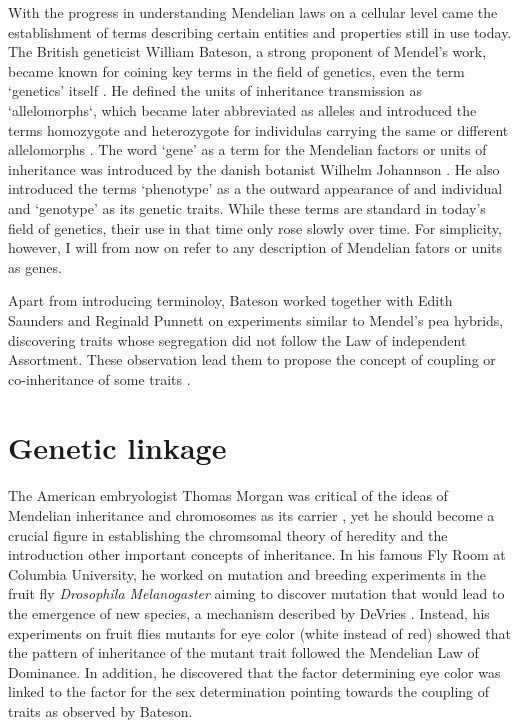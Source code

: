 With the progress in understanding Mendelian laws on a cellular level came the establishment of terms describing certain entities and properties still in use today. The British geneticist William Bateson, a strong proponent of Mendel's work, became known for coining key terms in the field of genetics, even the term `genetics' itself \citep{Dunwell2007}. He defined the units of inheritance transmission as `allelomorphs`, which became later abbreviated as alleles and introduced the terms homozygote and heterozygote for individulas carrying the same or different allelomorphs \citep{Bateson1902}. The word `gene' as a term for the Mendelian factors or units of inheritance was introduced by the danish botanist Wilhelm Johannson \citep{Johannsen1911}. He also introduced the terms `phenotype' as a the outward appearance of and individual and `genotype' as its genetic traits. While these terms are standard in today's field of genetics, their use in that time only rose slowly over time. For simplicity, however, I will from now on refer to any description of Mendelian fators or units as genes. 

Apart from introducing terminoloy, Bateson worked together with Edith Saunders and Reginald Punnett on experiments similar to Mendel's pea hybrids, discovering traits whose segregation did not follow the Law of independent Assortment. These observation lead them to propose the concept of coupling or co-inheritance of some traits \citep{Bateson1905}. 

\section{Genetic linkage}
The American embryologist Thomas Morgan was critical of the ideas of Mendelian inheritance and chromosomes as its carrier \citep{Allen1968}, yet he should become a crucial figure in establishing the chromsomal theory of heredity and the introduction other important concepts of inheritance. In his famous Fly Room at Columbia University, he worked on mutation and breeding experiments in the fruit fly \textit{Drosophila Melanogaster} aiming to discover mutation that would lead to the emergence of new species, a mechanism described by DeVries \citep{Allen1968}. Instead, his experiments on fruit flies mutants for eye color (white instead of red) showed that the pattern of inheritance of the mutant trait followed the Mendelian Law of Dominance. In addition, he discovered that the factor determining eye color was linked to the factor for the sex determination \citep{Morgan1910,Morgan1911a} pointing towards the coupling of traits as observed by Bateson.

